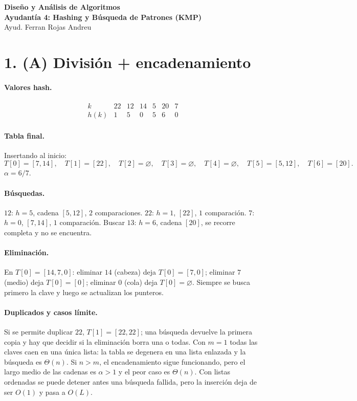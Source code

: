\documentclass[11pt]{article}
\newcommand{\coursetitle}{Diseño y Análisis de Algoritmos}
\newcommand{\lecturenumber}{4}
\newcommand{\lecturetitle}{Hashing y Búsqueda de Patrones (KMP)}
\newcommand{\instructor}{Ayud. Ferran Rojas Andreu}
\begin{document}
\begin{center}
  {\Large \textbf{\coursetitle}}\\[0.25em]
  {\large \textbf{Ayudantía \lecturenumber: \lecturetitle}}\\[0.25em]
  {\small \instructor}
\end{center}

\section*{1. (A) División + encadenamiento}

\paragraph{Valores hash.}
\[
\begin{array}{c|cccccc}
k & 22 & 12 & 14 & 5 & 20 & 7\\ \hline
h(k) & 1 & 5 & 0 & 5 & 6 & 0
\end{array}
\]

\paragraph{Tabla final.}
Insertando al inicio:
\[
T[0]=[7,14],\quad T[1]=[22],\quad T[2]=\varnothing,\quad T[3]=\varnothing,\quad T[4]=\varnothing,\quad T[5]=[5,12],\quad T[6]=[20].
\]
\(\alpha=6/7\).

\paragraph{Búsquedas.}
\(12\): \(h=5\), cadena \([5,12]\), \(2\) comparaciones. \(22\): \(h=1\), \([22]\), \(1\) comparación. \(7\): \(h=0\), \([7,14]\), \(1\) comparación. Buscar \(13\): \(h=6\), cadena \([20]\), se recorre completa y no se encuentra.

\paragraph{Eliminación.}
En \(T[0]=[14,7,0]\): eliminar \(14\) (cabeza) deja \(T[0]=[7,0]\); eliminar \(7\) (medio) deja \(T[0]=[0]\); eliminar \(0\) (cola) deja \(T[0]=\varnothing\). Siempre se busca primero la clave y luego se actualizan los punteros.

\paragraph{Duplicados y casos límite.}
Si se permite duplicar \(22\), \(T[1]=[22,22]\); una búsqueda devuelve la primera copia y hay que decidir si la eliminación borra una o todas. Con \(m=1\) todas las claves caen en una única lista: la tabla se degenera en una lista enlazada y la búsqueda es \(\Theta(n)\). Si \(n>m\), el encadenamiento sigue funcionando, pero el largo medio de las cadenas es \(\alpha>1\) y el peor caso es \(\Theta(n)\). Con listas ordenadas se puede detener antes una búsqueda fallida, pero la inserción deja de ser \(O(1)\) y pasa a \(O(L)\).
\end{document}
